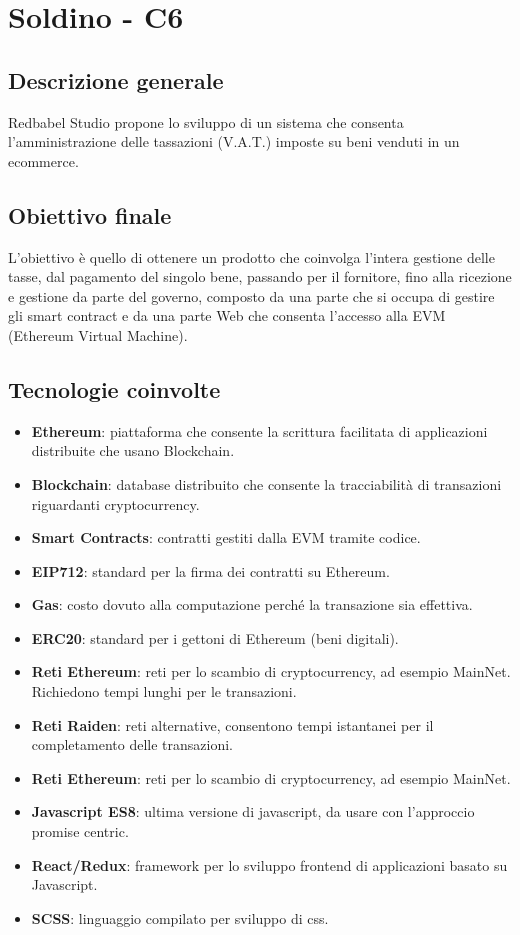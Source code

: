 \section{Soldino - C6} \label{c6}
    \subsection{Descrizione generale}
    Redbabel Studio propone lo sviluppo di un sistema che consenta l'amministrazione delle tassazioni (V.A.T.) imposte su beni venduti in un ecommerce.
    \subsection{Obiettivo finale}
    
    L'obiettivo è quello di ottenere un prodotto che coinvolga l'intera gestione delle tasse, dal pagamento del singolo bene, passando per il fornitore, fino alla ricezione e gestione da parte del governo, composto da una parte che si occupa di gestire gli smart contract e da una parte Web che consenta l'accesso alla EVM (Ethereum Virtual Machine).

    \subsection{Tecnologie coinvolte}
    	\begin{itemize}
        \item \textbf{Ethereum}: piattaforma che consente la scrittura facilitata di applicazioni distribuite che usano Blockchain.
		\item \textbf{Blockchain}: database distribuito che consente la tracciabilità di transazioni riguardanti cryptocurrency.
        \item \textbf{Smart Contracts}: contratti gestiti dalla EVM tramite codice.
		\item \textbf{EIP712}: standard per la firma dei contratti su Ethereum.
		\item \textbf{Gas}: costo dovuto alla computazione perché la transazione sia effettiva.
		\item \textbf{ERC20}: standard per i gettoni di Ethereum (beni digitali).
		\item \textbf{Reti Ethereum}: reti per lo scambio di cryptocurrency, ad esempio MainNet. Richiedono tempi lunghi per le transazioni.
        \item \textbf{Reti Raiden}: reti alternative, consentono tempi istantanei per il completamento delle transazioni.
        \item \textbf{Reti Ethereum}: reti per lo scambio di cryptocurrency, ad esempio MainNet.
        \item \textbf{Javascript ES8}: ultima versione di javascript, da usare con l'approccio promise centric.
        \item \textbf{React/Redux}: framework per lo sviluppo frontend di applicazioni basato su Javascript.
        \item \textbf{SCSS}: linguaggio compilato per sviluppo di css.
	\end{itemize}
	

